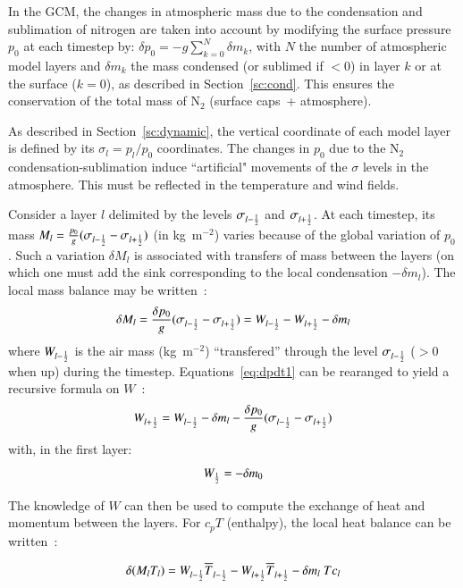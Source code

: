 In the GCM, the changes in atmospheric mass due to the condensation and sublimation of nitrogen 
are taken into account by modifying the surface
pressure $p_0$ at each timestep by:
$\delta p_0 = -g \sum_{k=0}^{N}\delta m_k $,
with  $N$ the number of atmospheric model layers 
and $\delta m_k$ the mass condensed (or sublimed if $<0$) in layer $k$
or at the surface ($k=0$), as described in Section~\ref{sc:cond}.  
This ensures the conservation of the  total mass of N$_2$ (surface caps~+ atmosphere).

As described in Section~\ref{sc:dynamic}, 
the vertical coordinate of each model layer is defined by its
$\sigma_l = p_l/p_0$ coordinates. 
The changes in $p_0$  due to the N$_2$
condensation-sublimation induce ``artificial" movements of
the  $\sigma$ levels in the atmosphere.
This must be reflected in the temperature and wind fields.

Consider a
layer $l$ delimited by the levels $\sigma_{l-\frac{1}{2}}$
and  $\sigma_{l+\frac{1}{2}}$. At each timestep, its mass  $M_l =
\frac{p_0}{g}(\sigma_{l-\frac{1}{2}} -\sigma_{l+\frac{1}{2}})$ (in kg~m$^{-2}$)  
varies because of the global
variation of $p_0$. Such a variation $\delta M_l$ is associated with transfers
of mass between the layers (on which one must add the sink
corresponding to the local condensation $-\delta m_l$).  The local mass
balance may be written~:
\begin{equation}
\label{eq:dpdt1}
{\delta M_l} =
\frac{\delta p_0}{g}(\sigma_{l-\frac{1}{2}} -\sigma_{l+\frac{1}{2}})=
W_{l-\frac{1}{2}} - W_{l+\frac{1}{2}} - \delta m_l 
\end{equation}
where $W_{l-\frac{1}{2}}$ is the air mass (kg~m$^{-2}$) ``transfered''
through  the level $\sigma_{l-\frac{1}{2}}$ ($>0$ when up) during the timestep.
Equations~\ref{eq:dpdt1} can be rearanged to yield a  recursive formula on $W$~:
\begin{equation}
W_{l+\frac{1}{2}} = W_{l-\frac{1}{2}} - {\delta m_l} 
-\frac{\delta p_0}{g}(\sigma_{l-\frac{1}{2}} -\sigma_{l+\frac{1}{2}})
\end{equation}
with, in the first layer:
\begin{equation}
W_{\frac{1}{2}} = -\delta m_0
\end{equation}

The knowledge of $W$ can then be used
 to compute the exchange of
heat and momentum between the layers.
For $c_p T$ (enthalpy), the local heat balance can be written~:

\begin{equation}
\label{eq:transport1}
{\delta( M_l T_l)} = W_{l-\frac{1}{2}} \overline{T}_{l-\frac{1}{2}}
  - W_{l+\frac{1}{2}} \overline{T}_{l+\frac{1}{2}} - \delta m_l \ Tc_l
\end{equation}

